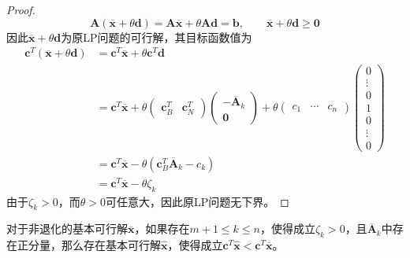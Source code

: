 \documentclass[lang = cn, scheme = chinese, thmcnt = section]{elegantbook}
\newcommand{\bs}{\boldsymbol}          %
\begin{document}
\begin{proof}
	$$
	\bs{A}(\overline{\bs{x}}+\theta\bs{d})
	=\bs{A}\overline{\bs{x}}+\theta\bs{A}\bs{d}
	=\bs{b},\qquad 
	\overline{\bs{x}}+\theta\bs{d}\ge\bs{0}
	$$
	因此$\overline{\bs{x}}+\theta\bs{d}$为原LP问题的可行解，其目标函数值为
	\begin{align*}
		\bs{c}^T(\overline{\bs{x}}+\theta\bs{d})
		& = \bs{c}^T\overline{\bs{x}}+\theta\bs{c}^T\bs{d}\\
		& = \bs{c}^T\overline{\bs{x}}
		+\theta\begin{pmatrix}
			\bs{c}_B^T & \bs{c}_N^T
		\end{pmatrix}
		\begin{pmatrix}
			-\overline{\bs{A}}_k \\ \bs{0}
		\end{pmatrix}
		+\theta\begin{pmatrix}
			c_1 & \cdots & c_n
		\end{pmatrix}
		\begin{pmatrix}
			0 \\ \vdots \\ 0 \\ 1 \\ 0 \\ \vdots \\ 0
		\end{pmatrix}\\
		& = \bs{c}^T\overline{\bs{x}}-\theta(\bs{c}_B^T\overline{\bs{A}}_k-c_k)\\
		& = \bs{c}^T\overline{\bs{x}}-\theta\zeta_k
	\end{align*}
	由于$\zeta_k>0$，而$\theta>0$可任意大，因此原LP问题无下界。
\end{proof}

\begin{theorem}
	对于非退化的基本可行解$\overline{\bs{x}}$，如果存在$m+1\le k\le n$，使得成立$\zeta_k>0$，且$\overline{\bs{A}}_k$中存在正分量，那么存在基本可行解$\hat{\bs{x}}$，使得成立$\bs{c}^T\hat{\bs{x}}<\bs{c}^T\overline{\bs{x}}$。
\end{theorem}
\end{document}
